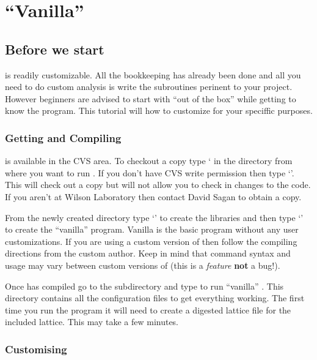 

\chapter{``Vanilla'' \tao}
\label{c:vanilla_tao}

\section{Before we start}
\label{s:before_beginning}

\tao is readily customizable. All the bookkeeping has already been done and all
you need to do custom analysis is write the subroutines perinent to your
project. However beginners are advised to start with
``out of the box'' \tao while getting to know the program. This tutorial will
how to customize \tao for your speciffic purposes.

\subsection{Getting and Compiling \tao}

\tao is available in the \cesr CVS area. To checkout a copy type ` in the directory from where you want to run \tao. If you don't have \cesr
CVS write permission then type `'. This will check out a copy
but will not allow you to check in changes to the code. If you aren't at Wilson
Laboratory then contact David Sagan  to obtain a copy. 

From the newly created  directory type `' to create the
libraries and then type `' to create
the ``vanilla'' \tao program. Vanilla \tao is the basic \tao program without any
user customizations. If you are using a custom version of \tao then
follow the compiling directions from the custom \tao author. Keep in mind that
command syntax and usage may vary between custom versions of \tao (this is a
\textit{feature} \textbf{not} a bug!).

Once \tao has compiled go to the subdirectory  and type
 to run ``vanilla'' \tao. This directory contains all the
configuration files to get everything working. The first time you run the
program it will need to create a digested \bmad lattice file for the included
lattice. This may take a few minutes.

\subsection{Customising \tao}

